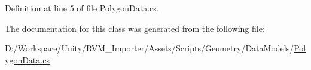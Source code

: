 Definition at line 5 of file Polygon\+Data.\+cs.



The documentation for this class was generated from the following file\+:\begin{DoxyCompactItemize}
\item 
D\+:/\+Workspace/\+Unity/\+R\+V\+M\+\_\+\+Importer/\+Assets/\+Scripts/\+Geometry/\+Data\+Models/\mbox{\hyperlink{_polygon_data_8cs}{Polygon\+Data.\+cs}}\end{DoxyCompactItemize}

